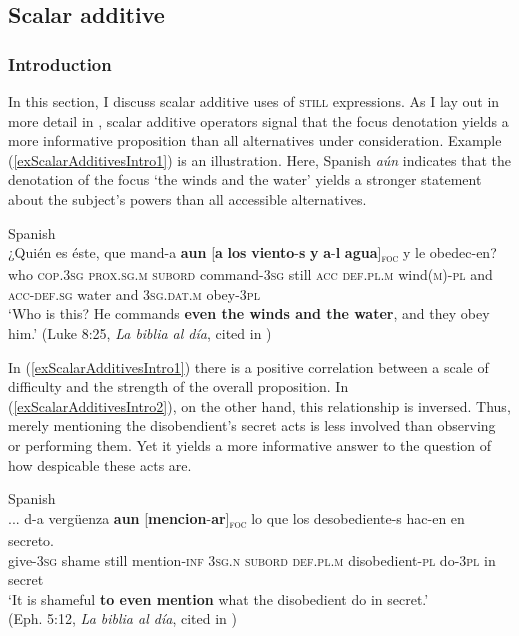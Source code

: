 {\subsection{Scalar additive}
\label{sectionScalarAdditive}
\subsubsection{Introduction} In this section, I discuss scalar additive uses of \textsc{still} expressions. As I lay out in more detail in , scalar additive operators signal that the focus denotation yields a more informative proposition than all alternatives under consideration. Example (\ref{exScalarAdditivesIntro1}) is an illustration. Here, Spanish \textit{aún} indicates that the denotation of the focus \lq the winds and the water\rq{ }yields a stronger statement about the subject's powers than all accessible alternatives.

\begin{exe}
	\ex Spanish\label{exScalarAdditivesIntro1}\\
	\gll ¿Quién es éste, que mand-a \textbf{aun} \textup{[}\textbf{a} \textbf{los} \textbf{viento}-\textbf{s} \textbf{y} \textbf{a}-\textbf{l} \textbf{agua}\textup{]\textsubscript{\textsc{foc}}} y le obedec-en?\\
	\phantom{¿}who \textsc{cop}.3\textsc{sg} \textsc{prox}.\textsc{sg}.\textsc{m} \textsc{subord} command-3\textsc{sg} still \phantom{[}\textsc{acc} \textsc{def}.\textsc{pl}.\textsc{m} wind(\textsc{m})-\textsc{pl} and \textsc{acc}-\textsc{def}.\textsc{sg} water and 3\textsc{sg}.\textsc{dat}.\textsc{m} obey-3\textsc{pl}\\
	\glt \lq Who is this? He commands \textbf{even the winds and the water}, and they obey him.' (Luke 8:25, \textit{La biblia al día}, cited in \cite[3]{GastvanderAuwera2011})
\end{exe}

In (\ref{exScalarAdditivesIntro1}) there is a positive correlation between a scale of difficulty and the strength of the overall proposition. In (\ref{exScalarAdditivesIntro2}), on the other hand, this relationship is inversed. Thus, merely mentioning the disobendient's secret acts is less involved than observing or performing them. Yet it yields a more informative answer to the question of how despicable these acts are.

\begin{exe}
	\ex Spanish\label{exScalarAdditivesIntro2}\\
	\gll ... d-a vergüenza \textbf{aun} \textup{[}\textbf{mencion}-\textbf{ar}\textup{]\textsubscript{\textsc{foc}}} lo que los desobediente-s hac-en en secreto.\\
	{} give-3\textsc{sg} shame still \phantom{[}mention-\textsc{inf} 3\textsc{sg}.\textsc{n} \textsc{subord} \textsc{def}.\textsc{pl}.\textsc{m} disobedient-\textsc{pl} do-3\textsc{pl} in secret\\
	\glt \lq It is shameful \textbf{to even mention} what the disobedient do in secret.'
	\\(Eph. 5:12, \textit{La biblia al día}, cited in \cite[2]{GastvanderAuwera2011})
\end{exe}

}
